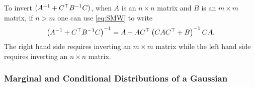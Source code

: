 To invert $(A^{-1} + C^\top B^{-1} C)$, when $A$ is an $n\times
n$ matrix and $B$ is an $m \times m$ matrix, if $n > m$ one can use
\eqref{eq:SMW} to write
\begin{equation}
  \label{eq:MatrixInversion}
  \left(A^{-1} + C^\top  B ^{-1}C \right)^{-1} = A - AC^\top
  \left( CAC^\top +  B  \right)^{-1}CA.
\end{equation}
The right hand side requires inverting an $m \times m$ matrix while
the left hand side requires inverting an $n \times n$ matrix.

\subsubsection{Marginal and Conditional Distributions of a Gaussian}

